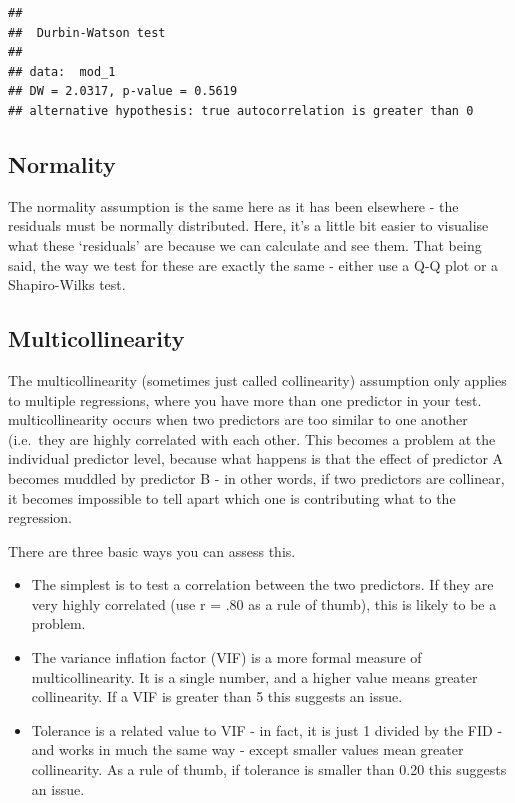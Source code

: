 \documentclass[
]{book}
\providecommand{\tightlist}{%
  \setlength{\itemsep}{0pt}\setlength{\parskip}{0pt}}
\begin{document}
\begin{verbatim}
## 
##  Durbin-Watson test
## 
## data:  mod_1
## DW = 2.0317, p-value = 0.5619
## alternative hypothesis: true autocorrelation is greater than 0
\end{verbatim}

\subsection{Normality}\label{normality}

The normality assumption is the same here as it has been elsewhere - the residuals must be normally distributed. Here, it's a little bit easier to visualise what these `residuals' are because we can calculate and see them. That being said, the way we test for these are exactly the same - either use a Q-Q plot or a Shapiro-Wilks test.

\subsection{Multicollinearity}\label{multicollinearity}

The multicollinearity (sometimes just called collinearity) assumption only applies to multiple regressions, where you have more than one predictor in your test. multicollinearity occurs when two predictors are too similar to one another (i.e.~they are highly correlated with each other. This becomes a problem at the individual predictor level, because what happens is that the effect of predictor A becomes muddled by predictor B - in other words, if two predictors are collinear, it becomes impossible to tell apart which one is contributing what to the regression.

There are three basic ways you can assess this.

\begin{itemize}
\tightlist
\item
  The simplest is to test a correlation between the two predictors. If they are very highly correlated (use r = .80 as a rule of thumb), this is likely to be a problem.
\item
  The variance inflation factor (VIF) is a more formal measure of multicollinearity. It is a single number, and a higher value means greater collinearity. If a VIF is greater than 5 this suggests an issue.
\item
  Tolerance is a related value to VIF - in fact, it is just 1 divided by the FID - and works in much the same way - except smaller values mean greater collinearity. As a rule of thumb, if tolerance is smaller than 0.20 this suggests an issue.
\end{itemize}
\end{document}
